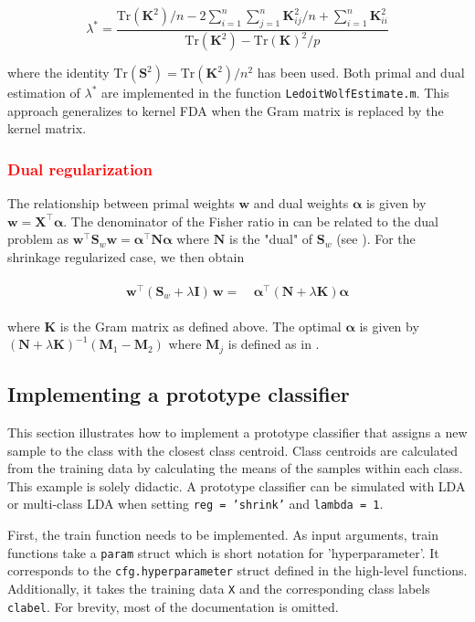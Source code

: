 \documentclass[utf8]{frontiersSCNS} %
\newcommand{\al}{\boldsymbol{\alpha}}
\newcommand{\w}{\mathbf{w}}
\newcommand{\I}{\mathbf{I}}
\newcommand{\K}{\mathbf{K}}
\newcommand{\M}{\mathbf{M}}
\renewcommand{\S}{\mathbf{S}}
\newcommand{\Tr}[1]{\text{Tr}(#1)}
\newcommand{\X}{\mathbf{X}}
\newcommand{\ttt}[1]{\texttt{#1}}
\newcommand{\red}[1]{\textcolor{red}{#1}}
\begin{document}
\begin{equation}\label{eq:LedoitWolfDual}
\lambda^* = \frac{\Tr{\K^2}/n - 2\sum_{i=1}^n\sum_{j=1}^n \K_{ij}^2/n + \sum_{i=1}^n \K_{ii}^2 }%
{\Tr{\K^2} - \Tr{\K}^2/p}
\end{equation}

where the identity $\Tr{\S^2} = \Tr{\K^2}/n^2$ has been used. Both primal and dual estimation of $\lambda^*$ are implemented in the function \ttt{LedoitWolfEstimate.m}. This approach generalizes to kernel FDA when the Gram matrix is replaced by the kernel matrix.


\red{\subsubsection{Dual regularization}}

The relationship between primal weights $\w$ and dual weights $\al$ is given by $\w = \X^\top\al$. The denominator of the Fisher ratio in  can be related to the dual problem as $\w^\top\S_w\w = \al^\top\mathbf{N}\al$ where $\mathbf{N}$ is the "dual" of $\S_w$ (see ). For the shrinkage regularized case, we then obtain 

\begin{align}
\begin{split}
\label{eq:dualLDA}
\w^\top(\S_w + \lambda\I)\,\w =&\ \al^\top(\mathbf{N} + \lambda\K)\al
\end{split}
\end{align}

where $\K$ is the Gram matrix as defined above. The optimal $\al$ is given by $(\mathbf{N} + \lambda\K)^{-1}(\M_1 - \M_2)$ where $\M_j$ is defined as in .


\subsection{Implementing a prototype classifier}

This section illustrates how to implement a prototype classifier that assigns a new sample to the class with the closest class centroid. Class centroids are calculated from the training data by calculating the means of the samples within each class. This example is solely didactic. A prototype classifier can be simulated with LDA or multi-class LDA when setting \ttt{reg = 'shrink'} and \ttt{lambda = 1}.

First, the train function needs to be implemented. As input arguments, train functions take a \ttt{param} struct which is short notation for 'hyperparameter'. It corresponds to the \ttt{cfg.hyperparameter} struct defined in the high-level functions. Additionally, it takes the training data \ttt{X} and the corresponding class labels \ttt{clabel}. For brevity, most of the documentation is omitted.
\end{document}

